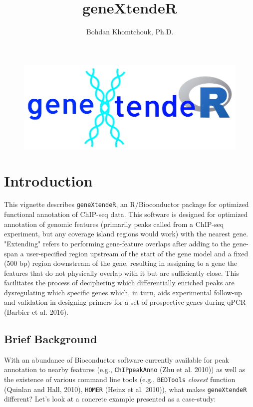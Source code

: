 \documentclass[12pt]{article}
\title{geneXtendeR}
\author{Bohdan Khomtchouk, Ph.D.}
\begin{document}


\maketitle

\begin{figure}[H]
\centering
\includegraphics[width=0.7\columnwidth]{figures/geneXtendeRlogo.png}
\end{figure}

\tableofcontents

\section{Introduction}

This vignette describes \texttt{geneXtendeR}, an R/Bioconductor package for optimized functional annotation of ChIP-seq data.  This software is designed for optimized annotation of genomic features (primarily peaks called from a ChIP-seq experiment, but any coverage island regions would work) with the nearest gene. "Extending" refers to performing gene-feature overlaps after adding to the gene-span a user-specified region upstream of the start of the gene model and a fixed (500 bp) region downstream of the gene, resulting in assigning to a gene the features that do not physically overlap with it but are sufficiently close.  This facilitates the process of deciphering which differentially enriched peaks are dysregulating which specific genes which, in turn, aids experimental follow-up and validation in designing primers for a set of prospective genes during qPCR (Barbier et al. 2016).  

\subsection{Brief Background}

With an abundance of Bioconductor software currently available for peak annotation to nearby features (e.g., \texttt{ChIPpeakAnno} (Zhu et al. 2010)) as well as the existence of various command line tools (e.g., \texttt{BEDTools} \emph{closest} function (Quinlan and Hall, 2010), \texttt{HOMER} (Heinz et al. 2010)), what makes \texttt{geneXtendeR} different?  Let's look at a concrete example presented as a case-study:
\end{document}
